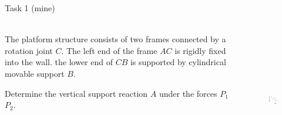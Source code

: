 \documentclass[aspectratio=169]{beamer}
\begin{document}
\begin{frame}[t]{Task 1 (mine)}
\framesubtitle{}
    \begin{columns}[T,onlytextwidth]
        \begin{column}{0.59\textwidth}
            The platform structure consists of two frames connected by a rotation joint $C$. The left end of the frame $AC$ is rigidly fixed into the wall. the lower end of $CB$ is supported by cylindrical movable support $B$. 
            \medskip
            
            Determine the vertical support reaction $A$ under 
            the forces $P_1$ $P_2$.
        \end{column}
        \begin{column}{0.39\textwidth}
            \begin{figure}[H]
                \centering\includegraphics[height=6cm,width=1\textwidth,keepaspectratio]{image14.png}
                \label{fig:image14.png}
            \end{figure}
        \end{column}
    \end{columns}
\end{frame}
\end{document}

